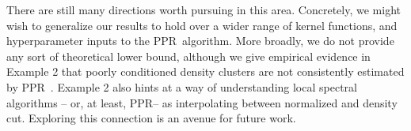 \documentclass{article}
\newcommand{\1}{\mathbf{1}}
\newcommand{\ppr}{{\sc PPR}}
\newcommand{\pprspace}{{\sc PPR~}}
\theoremstyle{aldenthm}
\theoremstyle{remark}
\begin{document}
There are still many directions worth pursuing in this area. Concretely, we might wish to generalize our results to hold over a wider range of kernel functions, and hyperparameter inputs to the \pprspace algorithm. More broadly, we do not provide any sort of theoretical lower bound, although we give empirical evidence in Example 2 that poorly conditioned density clusters are not consistently estimated by \pprspace. Example 2 also hints at a way of understanding local spectral algorithms -- or, at least, \ppr-- as interpolating between normalized and density cut. Exploring this connection is an avenue for future work.

\clearpage



\end{document}
